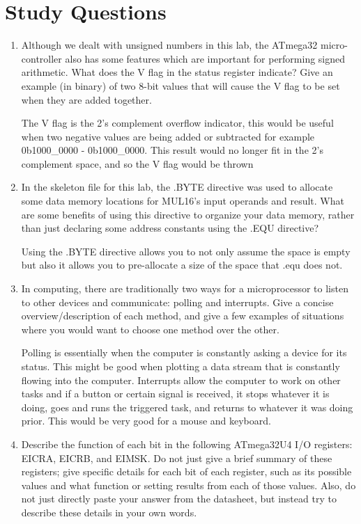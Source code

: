 \documentclass[12pt,letterpaper]{article}
\begin{document}
\section{Study Questions}
\begin{enumerate}
    \item
    Although we dealt with unsigned numbers in this lab, the ATmega32 micro-controller also has some features which are important for performing signed arithmetic. What does the V flag in the status register indicate? Give an example (in binary) of two 8-bit values that will cause the V flag to be set when they are added together.
    
    The V flag is the 2's complement overflow indicator, this would be useful when two negative values are being added or subtracted for example 0b1000\_0000 - 0b1000\_0000. This result would no longer fit in the 2's complement space, and so the V flag would be thrown
    
    
    \item 
    In the skeleton file for this lab, the .BYTE directive was used to allocate some data memory locations for MUL16’s input operands and result. What are some benefits of using this directive to organize your data memory, rather than just declaring some address constants using the .EQU directive?
    
    Using the .BYTE directive allows you to not only assume the space is empty but also it allows you to pre-allocate a size of the space that .equ does not.
    
    
    \item 
    In computing, there are traditionally two ways for a microprocessor to listen to other devices and communicate: polling and interrupts. Give a concise overview/description of each method, and give a few examples of situations
    where you would want to choose one method over the other.    
    
    Polling is essentially when the computer is constantly asking a device for its status. This might be good when plotting a data stream that is constantly flowing into the computer. Interrupts allow the computer to work on other tasks and if a button or certain signal is received, it stops whatever it is doing, goes and runs the triggered task, and returns to whatever it was doing prior. This would be very good for a mouse and keyboard. 
    
    \item
	Describe the function of each bit in the following ATmega32U4 I/O registers: EICRA, EICRB, and EIMSK. Do not just give a brief summary of these registers; give specific details for each bit of each register, such as its possible values and what function or setting results from each of those values. Also, do not just directly paste your answer from the datasheet, but instead try	to describe these details in your own words.
	

\end{enumerate}
\end{document}
